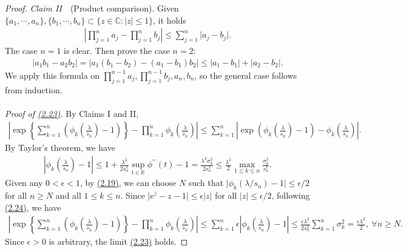 \documentclass{article}
\numberwithin{equation}{section}
\newcommand{\e}{\mathrm{e}}
\theoremstyle{plain}
\theoremstyle{definition}
\begin{document}
\begin{proof}
\textit{Claim II}\ \ (Product comparison). Given $\{a_1,\cdots,a_n\},\{b_1,\cdots,b_n\}\subset\{z\in\mathbb{C}:\vert z\vert\leq 1\}$, it holds
\begin{align*}
	\left\vert\prod_{j=1}^n a_j - \prod_{j=1}^n b_j\right\vert\leq \sum_{j=1}^n\vert a_j-b_j\vert.
\end{align*}
The case $n=1$ is clear. Then prove the case $n=2$:
\begin{align*}
	\left\vert a_1b_1 - a_2b_2\right\vert = \left\vert a_1(b_1-b_2) - (a_1-b_1)b_2\right\vert\leq\left\vert a_1 - b_1\right\vert+\left\vert a_2 - b_2\right\vert.
\end{align*}
We apply this formula on $\prod_{j=1}^{n-1}a_j,\prod_{j=1}^{n-1}b_j,a_n,b_n$, so the general case follows from induction.

\paragraph{}\textit{Proof of \hyperref[eq:2.23]{(2.23)}.} By Claims I and II,
\begin{align*}
	\left\vert\exp\left\{\sum_{k=1}^n\left(\phi_k\left(\frac{\lambda}{s_n}\right)-1\right)\right\} - \prod_{k=1}^n\phi_k\left(\frac{\lambda}{s_n}\right)\right\vert\leq\sum_{k=1}^n\left\vert\exp\left(\phi_k\left(\frac{\lambda}{s_n}\right)-1\right) - \phi_k\left(\frac{\lambda}{s_n}\right)\right\vert.\tag{2.24}\label{eq:2.24}
\end{align*}
By Taylor's theorem, we have
\begin{align*}
	\left\vert\phi_k\left(\frac{\lambda}{s_n}\right)-1\right\vert\leq 1+\frac{\lambda^2}{2s_n^2}\sup_{t\in\mathbb{R}}\phi^{\prime\prime}(t) - 1 = \frac{\lambda^2\sigma_k^2}{2s_n^2}\leq\frac{\lambda^2}{2}\max_{1\leq k\leq n}\frac{\sigma_k^2}{s_n^2}.
\end{align*}
Given any $0<\epsilon<1$, by \hyperref[eq:2.19]{(2.19)}, we can choose $N$ such that $\vert\phi_k(\lambda/s_n)-1\vert\leq\epsilon/2$ for all $n\geq N$ and all $1\leq k\leq n$. Since $\vert\e^z - z - 1\vert\leq\epsilon\vert z\vert$ for all $\vert z\vert\leq\epsilon/2$, following \hyperref[eq:2.24]{(2.24)}, we have
\begin{align*}
	\left\vert\exp\left\{\sum_{k=1}^n\left(\phi_k\left(\frac{\lambda}{s_n}\right)-1\right)\right\} - \prod_{k=1}^n\phi_k\left(\frac{\lambda}{s_n}\right)\right\vert\leq\sum_{k=1}^n\epsilon\left\vert\phi_k\left(\frac{\lambda}{s_n}\right) - 1\right\vert\leq\frac{\epsilon\lambda^2}{2s_n^2}\sum_{k=1}^n \sigma_k^2 = \frac{\epsilon\lambda^2}{2},\ \forall n\geq N.
\end{align*}
Since $\epsilon>0$ is arbitrary, the limit \hyperref[eq:2.23]{(2.23)} holds.


\end{proof}
\end{document}
